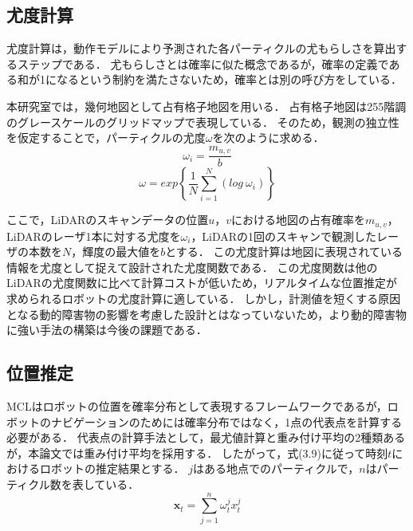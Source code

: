 \subsection{尤度計算}
尤度計算は，動作モデルにより予測された各パーティクルの尤もらしさを算出するステップである．
尤もらしさとは確率に似た概念であるが，確率の定義である和が1になるという制約を満たさないため，確率とは別の呼び方をしている．

本研究室では，幾何地図として占有格子地図を用いる．
占有格子地図は255階調のグレースケールのグリッドマップで表現している．
そのため，観測の独立性を仮定することで，パーティクルの尤度$\displaystyle \omega $を次のように求める．
\begin{equation}
\displaystyle \omega _{i} =\frac{m_{u,v}}{b} 
\end{equation}
\begin{equation}
\displaystyle \omega =exp\left\{\frac{1}{N}\sum _{i=1}^{N}( log\ \omega _{i})\right\}
\end{equation}

ここで，LiDARのスキャンデータの位置$\displaystyle u$，$\displaystyle v$における地図の占有確率を$\displaystyle m_{u,v}$，LiDARのレーザ1本に対する尤度を$\displaystyle \omega _{i}$，LiDARの1回のスキャンで観測したレーザの本数を$\displaystyle N$，輝度の最大値を$\displaystyle b$とする\cite{onolidar}．
この尤度計算は地図に表現されている情報を尤度として捉えて設計された尤度関数である．
この尤度関数は他のLiDARの尤度関数に比べて計算コストが低いため，リアルタイムな位置推定が求められるロボットの尤度計算に適している．
しかし，計測値を短くする原因となる動的障害物の影響を考慮した設計とはなっていないため，より動的障害物に強い手法の構築は今後の課題である．
\subsection{位置推定}
MCLはロボットの位置を確率分布として表現するフレームワークであるが，ロボットのナビゲーションのためには確率分布ではなく，1点の代表点を計算する必要がある．
代表点の計算手法として，最尤値計算と重み付け平均の2種類あるが，本論文では重み付け平均を採用する．
したがって，式(3.9)に従って時刻$\displaystyle t$におけるロボットの推定結果とする．
$\displaystyle j$はある地点でのパーティクルで，$\displaystyle n$はパーティクル数を表している．
\begin{equation}
 \displaystyle \mathbf{x}_{t} =\sum _{j=1}^{n} \omega _{t}^{j} x_{t}^{j} 
\end{equation}
